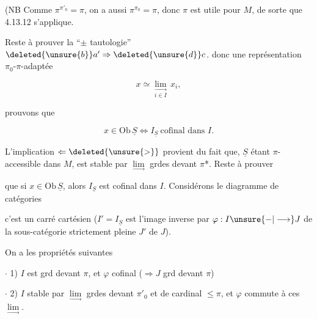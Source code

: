 (NB Comme $\pi^{\pi'_0}=\pi$,  on a aussi $\pi^{\pi_0}=\pi$, donc $\pi$ est utile pour $M$, \deleted{\unsure{)}} de sorte que 4.13.12 s'applique.

Reste à prouver la ``$\pm$ tautologie'' $\deleted{\unsure{b}}a'\Rightarrow\deleted{\unsure{d}}c$.   donc une représentation $\pi_0$-$\pi$-adaptée

\[
x\simeq\underset{i\in I}{\underset{\longrightarrow}{\lim}}\,x_i,
\]

prouvons que

\[
x\in\mathrm{Ob}\,\underline S\Longleftrightarrow I_{\underline S}\ \text{cofinal dans }I.
\]


L'implication $\Leftarrow\deleted{\unsure{>}}$ provient du fait que, $\underline S$ étant $\pi$-accessible dans $M$, est stable  par $\underset{\longrightarrow}{\lim}$ grdes devant $\pi$*. Reste à prouver


que si $x\in\mathrm{Ob}\,\underline S$, alors $I_{\underline S}$ est cofinal dans $I$. Considérons  le diagramme de catégories


c'est un carré cartésien ($I'=I_{\underline S}$ est l'image inverse par $\varphi:I\unsure{-|\longrightarrow}J$ de la sous-catégorie strictement pleine $J'$ de $J$). 

On a les propriétés suivantes

$\cdot$ 1) $I$ est grd devant $\pi$, et $\varphi$ cofinal ($\Longrightarrow J$ grd devant $\pi$)

$\cdot$ 2) $I$ stable par $\underset{\longrightarrow}{\lim}$ grdes devant $\pi'_0$ et de cardinal $\leq\pi$, et $\varphi$ commute à ces $\underset{\longrightarrow}{\lim}$.


